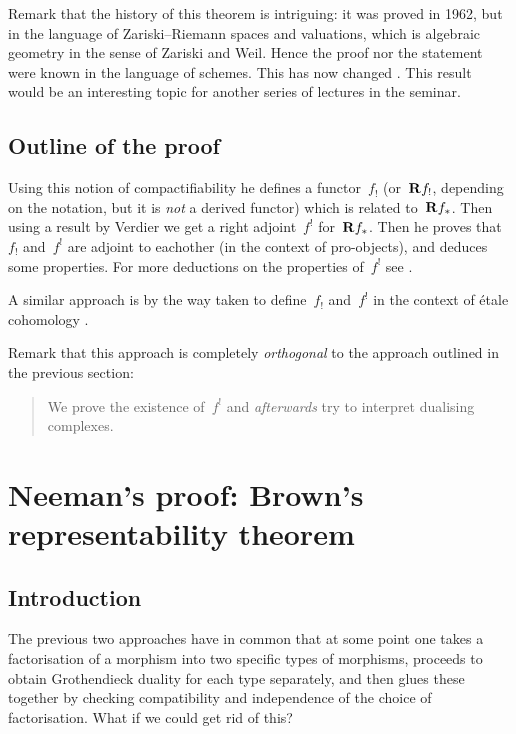 \documentclass[10pt,a4paper]{article}
\begin{document}
Remark that the history of this theorem is intriguing: it was proved in 1962, but in the language of Zariski--Riemann spaces and valuations, which is algebraic geometry in the sense of Zariski and Weil. Hence the proof nor the statement were known in the language of schemes. This has now changed \cite{lutkebohmert-compactification,conrad-delignes-notes-nagata-compactification,deligne-plongement-de-nagata}. This result would be an interesting topic for another series of lectures in the seminar.

\subsection{Outline of the proof}
Using this notion of compactifiability he defines a functor~$f_!$ (or~$\mathbf{R} f_!$, depending on the notation, but it is \emph{not} a derived functor) which is related to~$\mathbf{R} f_*$. Then using a result by Verdier \cite{verdier-bourbaki-300} we get a right adjoint~$f^!$ for~$\mathbf{R} f_*$. Then he proves that~$f_!$ and~$f^!$ are adjoint to eachother (in the context of pro-objects), and deduces some properties. For more deductions on the properties of~$f^!$ see \cite{verdier-base-change-twisted-inverse-image}.

A similar approach is by the way taken to define~$f_!$ and~$f^!$ in the context of \'etale cohomology \cite[expos\'e XVII]{sga43}.

Remark that this approach is completely \emph{orthogonal} to the approach outlined in the previous section:
\begin{quote}
  We prove the existence of~$f^!$ and \emph{afterwards} try to interpret dualising complexes.
\end{quote}

\section{Neeman's proof: Brown's representability theorem}
\label{section:neeman}
\subsection{Introduction}
The previous two approaches have in common that at some point one takes a factorisation of a morphism into two specific types of morphisms, proceeds to obtain Grothendieck duality for each type separately, and then glues these together by checking compatibility and independence of the choice of factorisation. What if we could get rid of this?
\end{document}
